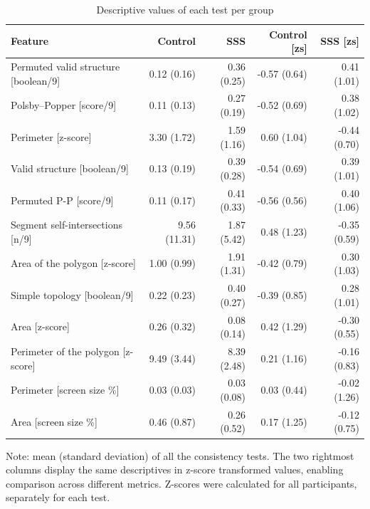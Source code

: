 \documentclass[
  man,
  floatsintext,
  longtable,
  a4paper,
  nolmodern,
  notxfonts,
  notimes,
  colorlinks=true,linkcolor=blue,citecolor=blue,urlcolor=blue]{apa7}
\begin{document}
\begin{table}

{\caption{{Descriptive values of each test per group}{\label{tbl-04}}}
\vspace{-20pt}}

\fontsize{12.0pt}{14.0pt}\selectfont
\begin{tabular*}{\linewidth}{@{\extracolsep{\fill}}lrrrr}
\toprule
Feature & Control & SSS & Control [zs] & SSS [zs] \\ 
\midrule\addlinespace[2.5pt]
Permuted valid structure [boolean/9] & 0.12 (0.16) & 0.36 (0.25) & -0.57 (0.64) & 0.41 (1.01) \\ 
Polsby–Popper [score/9] & 0.11 (0.13) & 0.27 (0.19) & -0.52 (0.69) & 0.38 (1.02) \\ 
Perimeter [z-score] & 3.30 (1.72) & 1.59 (1.16) & 0.60 (1.04) & -0.44 (0.70) \\ 
Valid structure [boolean/9] & 0.13 (0.19) & 0.39 (0.28) & -0.54 (0.69) & 0.39 (1.01) \\ 
Permuted P-P [score/9] & 0.11 (0.17) & 0.41 (0.33) & -0.56 (0.56) & 0.40 (1.06) \\ 
Segment self-intersections [n/9] & 9.56 (11.31) & 1.87 (5.42) & 0.48 (1.23) & -0.35 (0.59) \\ 
Area of the polygon [z-score] & 1.00 (0.99) & 1.91 (1.31) & -0.42 (0.79) & 0.30 (1.03) \\ 
Simple topology [boolean/9] & 0.22 (0.23) & 0.40 (0.27) & -0.39 (0.85) & 0.28 (1.01) \\ 
Area [z-score] & 0.26 (0.32) & 0.08 (0.14) & 0.42 (1.29) & -0.30 (0.55) \\ 
Perimeter of the polygon [z-score] & 9.49 (3.44) & 8.39 (2.48) & 0.21 (1.16) & -0.16 (0.83) \\ 
Perimeter [screen size \%] & 0.03 (0.03) & 0.03 (0.08) & 0.03 (0.44) & -0.02 (1.26) \\ 
Area [screen size \%] & 0.46 (0.87) & 0.26 (0.52) & 0.17 (1.25) & -0.12 (0.75) \\ 
\bottomrule
\end{tabular*}
\begin{minipage}{\linewidth}
\vspace{.05em}
Note: mean (standard deviation) of all the consistency tests. The two rightmost columns display the same descriptives in z-score transformed values, enabling comparison across different metrics. Z-scores were calculated for all participants, separately for each test.\\
\end{minipage}

\end{table}
\end{document}
